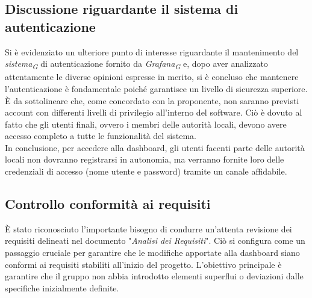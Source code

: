 \documentclass{article}
\begin{document}
    \subsection{Discussione riguardante il sistema di autenticazione}
    Si è evidenziato un ulteriore punto di interesse riguardante il mantenimento del \textit{sistema}\textsubscript{\textit{G}} di autenticazione fornito da \textit{Grafana}\textsubscript{\textit{G}} e, dopo aver analizzato attentamente le diverse opinioni espresse in merito, si è concluso che mantenere l'autenticazione è fondamentale poiché garantisce un livello di sicurezza superiore. \\
    È da sottolineare che, come concordato con la proponente, non saranno previsti account con differenti livelli di privilegio all'interno del software. Ciò è dovuto al fatto che gli utenti finali, ovvero i membri delle autorità locali, devono avere accesso completo a tutte le funzionalità del sistema. \\
    In conclusione, per accedere alla dashboard, gli utenti facenti parte delle autorità locali non dovranno registrarsi in autonomia, ma verranno fornite loro delle credenziali di accesso (nome utente e password) tramite un canale affidabile.

    \subsection{Controllo conformità ai requisiti}
    È stato riconosciuto l'importante bisogno di condurre un'attenta revisione dei requisiti delineati nel documento "\textit{Analisi dei Requisiti}". Ciò si configura come un passaggio cruciale per garantire che le modifiche apportate alla dashboard siano conformi ai requisiti stabiliti all'inizio del progetto. L'obiettivo principale è garantire che il gruppo non abbia introdotto elementi superflui o deviazioni dalle specifiche inizialmente definite.
\end{document}
